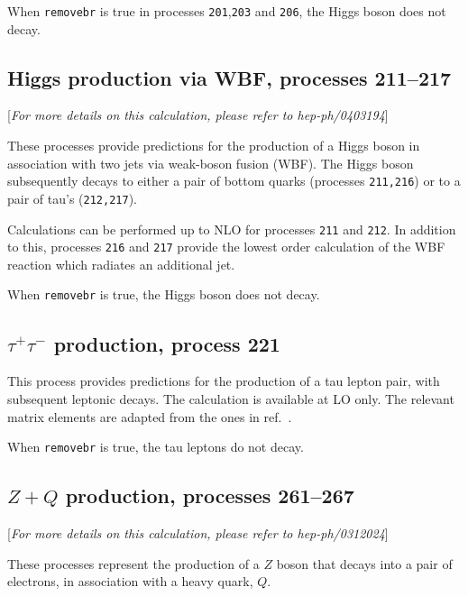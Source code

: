 \documentclass[12pt]{article}
\begin{document}
When {\tt removebr} is true in processes {\tt 201},{\tt 203} and {\tt 206},
the Higgs boson does not decay.

\subsection{Higgs production via WBF, processes 211--217}
\label{subsec:wbf}

\begin{center}
[{\it For more details on this calculation, please refer to hep-ph/0403194}]
\end{center}

These processes provide predictions for the production of a Higgs boson in
association with two jets via weak-boson fusion (WBF). The Higgs boson
subsequently decays to either a pair of bottom quarks
(processes {\tt 211,216}) or to a pair of tau's ({\tt 212,217}).

Calculations can be performed up to NLO for processes {\tt 211} and {\tt 212}.
In addition to this, processes {\tt 216} and {\tt 217} provide the lowest
order calculation of the WBF reaction which radiates an additional jet. 

When {\tt removebr} is true, the Higgs boson does not decay.

\subsection{$\tau^+\tau^-$ production, process 221}
\label{subsec:tautau}

This process provides predictions for the production of a tau lepton
pair, with subsequent leptonic decays. The calculation is available at LO
only. The relevant matrix elements are adapted from the ones in
ref.~\cite{Kleiss:1988xr}.

When {\tt removebr} is true, the tau leptons do not decay.

\subsection{$Z+Q$ production, processes 261--267}
\label{subsec:ZQ}

\begin{center}
[{\it For more details on this calculation, please refer to hep-ph/0312024}]
\end{center}

These processes represent the production of a $Z$
boson that decays into a pair of electrons,
in association with a heavy quark, $Q$.
\end{document}
